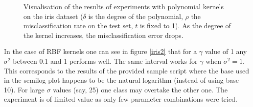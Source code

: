 \vspace{-0.5cm}
\begin{figure}[htp]
\centering
{}\hfil
{}\hfil
{}\hfil
{}\hfil
\caption{Visualisation of the results of experiments with polynomial kernels on the iris dataset ($\delta$ is the degree of the polynomial, $\rho$ the misclassification rate on the test set, $t$ is fixed to 1). As the degree of the kernel increases, the misclassification error drops.}
\label{iris}
\end{figure}

\par In the case of RBF kernels one can see in figure \ref{iris2} that for a $\gamma$ value of 1 any $\sigma^2$ between 0.1 and 1 performs well. The same interval works for $\gamma$ when $\sigma^2=1$. This corresponds to the results of the provided sample script where the base used in the semilog plot happens to be the natural logarithm (instead of using base 10). For large $\sigma$ values (say, 25) one class may overtake the other one. The experiment is of limited value as only few parameter combinations were tried.

